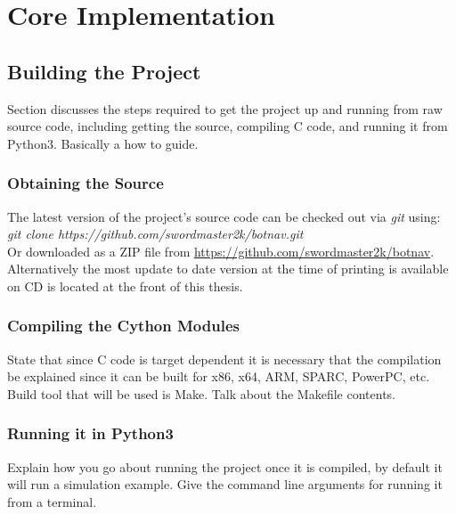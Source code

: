 \chapter{Core Implementation}


\section{Building the Project}
Section discusses the steps required to get the project up and running from raw source code, including getting the source, compiling C code, and running it from Python3. Basically a how to guide.

\subsection{Obtaining the Source}
\noindent 
The latest version of the project's source code can be checked out via \textit{git} using: \\

\indent \textit{git clone https://github.com/swordmaster2k/botnav.git} \\

\noindent
Or downloaded as a ZIP file from \url{https://github.com/swordmaster2k/botnav}. \\ 

\noindent
Alternatively the most update to date version at the time of printing is available on CD is located at the front of this thesis.

\subsection{Compiling the Cython Modules}
State that since C code is target dependent it is necessary that the compilation be explained since it can be built for x86, x64, ARM, SPARC, PowerPC, etc. Build tool that will be used is Make. Talk about the Makefile contents.

\subsection{Running it in Python3}
Explain how you go about running the project once it is compiled, by default it will run a simulation example. Give the command line arguments for running it from a terminal.


